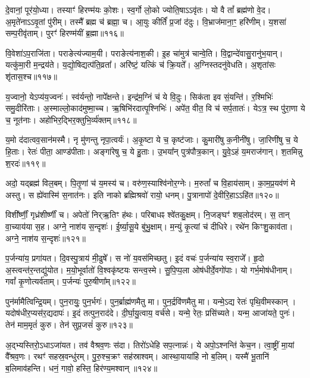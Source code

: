 दे॒वानां॒ पूर॑यो॒ध्या। तस्याꣳ॑ हिरण्म॑यः को॒शः। 
स्व॒र्गो लो॒को ज्योति॒षा\-ऽऽ\-वृ॑तः। यो वै तां᳚ ब्रह्म॑णो वे॒द। 
अ॒मृते॑नाऽऽवृ॒तां पु॑रीम्। तस्मै᳚ ब्रह्म च॑ ब्रह्मा॒ च। 
आ॒युः कीर्तिं॑ प्र॒जां द॑दुः। वि॒भ्राज॑माना॒ꣳ॒ हरि॑णीम्। 
य॒शसा॑ सम्प॒रीवृ॑ताम्। पुरꣳ॑ हिरण्म॑यीं ब्र॒ह्मा॥११६॥


वि॒वेशा॑ऽप॒राजि॑ता। पराङेत्य॑ज्याम॒यी। 
पराङेत्य॑नाश॒की। इ॒ह चा॑मुत्र॑ चान्वे॒ति। 
वि॒द्वान्दे॑वासु॒रानु॑भ॒यान्। यत्कु॑मा॒री म॒न्द्रय॑ते। 
य॒द्यो॒षिद्यत्प॑ति॒व्रता᳚। अरि॑ष्टं॒ यत्किं च॑ क्रि॒यते᳚। 
अ॒ग्निस्तदनु॑वेधति। अ॒शृता॑सः शृ॑तास॒श्च॥११७॥


य॒ज्वानो॒ येऽप्य॑य॒ज्वनः॑। स्व॑र्यन्तो॒ नापे᳚क्षन्ते। 
इन्द्र॑म॒ग्निं च॑ ये वि॒दुः। सिक॑ता इव सं॒यन्ति॑। 
र॒श्मिभिः॑ समु॒दीरि॑ताः। अ॒स्मा\-ल्लो॒का\-द॑मुष्मा॒च्च। 
ऋ॒षिभि॑रदात्पृ॒श्निभिः॑। 
अपे॑त॒ वीत॒ वि च॑ सर्प॒तातः॑। येऽत्र॒ स्थ पु॑रा॒णा ये च॒ नूत॑नाः। 
अहो॑भिर॒द्भिर॒क्तु\-भि॒र्व्य॑क्तम्॥११८॥


य॒मो द॑दात्वव॒सान॑मस्मै। नृ मु॑णन्तु नृपा॒त्वर्यः॑। 
अ॒कृ॒ष्टा ये च॒ कृष्ट॑जाः। कु॒मारी॑षु क॒नीनी॑षु। 
जा॒रिणी॑षु च॒ ये हि॒ताः। रेतः॑ पीता॒ आण्ड॑पीताः। 
अङ्गा॑रेषु च॒ ये हु॒ताः। उ॒भया᳚न्‌ पुत्र॑पौत्र॒कान्। 
यु॒वे॒ऽहं य॒मराज॑गान्। श॒तमिन्नु श॒रदः॑॥११९॥


अदो॒ यद्ब्रह्म॑ विल॒बम्। पि॒तृ॒णां च॑ य॒मस्य॑ च। 
वरु॑ण॒स्याश्वि॑नोर॒ग्नेः। म॒रुतां᳚ च वि॒हाय॑साम्। 
का॒म॒प्र॒यव॑णं मे अस्तु। स ह्ये॑वास्मि॑ स॒नात॑नः। 
इति नाको ब्रह्मिश्रवो॑ रायो॒ धनम्। पु॒त्रानापो॑ दे॒वीरि॒हाऽऽहि॑त॥१२०॥\anuvakamend


विशी᳚र्ष्णीं॒ गृध्र॑शीर्ष्णीं च। अपेतो॑ निर्‌ऋ॒तिꣳ ह॑थः। 
परिबाधꣴ श्वे॑तकु॒क्षम्। नि॒जङ्घꣳ॑ शब॒लोद॑रम्। 
स॒ तान्‌ वा॒च्याय॑या स॒ह। अग्ने॒ नाश॑य स॒न्दृशः॑। 
ई॒र्ष्या॒सू॒ये बु॑भु॒क्षाम्। म॒न्युं कृ॒त्यां च॑ दीधिरे। 
रथे॑न किꣳशु॒काव॑ता। अग्ने॒ नाश॑य स॒न्दृशः॑॥१२१॥\anuvakamend


प॒र्जन्या॑य॒ प्रगा॑यत। दि॒वस्पु॒त्राय॑ मी॒ढुषे᳚। 
स नो॑ य॒वस॑मिच्छतु। इ॒दं वचः॑ प॒र्जन्या॑य स्व॒राजे᳚। 
हृ॒दो अ॒स्त्वन्त॑र॒न्तद्यु॑योत। म॒यो॒भूर्वातो॑ वि॒श्वकृ॑ष्टयः सन्त्व॒स्मे। 
सु॒पि॒प्प॒ला ओष॑धीर्दे॒वगो॑पाः। यो गर्भ॒मोष॑धीनाम्। 
गवां᳚ कृ॒णोत्यर्व॑ताम्। प॒र्जन्यः॑ पुरु॒षीणा᳚म्॥१२२॥\anuvakamend


पुन॑र्मामैत्विन्द्रि॒यम्। पुन॒रायुः॒ पुन॒र्भगः॑। 
पुन॒र्ब्राह्म॑णमैतु मा। पुन॒र्द्रवि॑णमैतु मा। 
यन्मे॒ऽद्य रेतः॑ पृथि॒वीमस्कान्। यदोष॑धीर॒प्यस॑र॒द्यदापः॑। 
इ॒दं तत्पुन॒राद॑दे। दी॒र्घा॒यु॒त्वाय॒ वर्च॑से। 
यन्मे॒ रेतः॒ प्रसि॑च्यते। यन्म॒ आजा॑यते॒ पुनः॑। 
तेन॑ माम॒मृतं॑ कुरु। तेन॑ सुप्र॒जसं॑ कुरु॥१२३॥\anuvakamend


अ॒द्भ्यस्तिरो॒ऽधाऽजा॑यत। तव॑ वैश्रव॒णः स॑दा। 
तिरो॑ऽधेहि सप॒त्नान्नः॑। ये अपो॒ऽश्नन्ति॑ केच॒न। 
त्वा॒ष्ट्रीं मा॒यां वै᳚श्रव॒णः। रथꣳ॑ सहस्र॒वन्धु॑रम्। 
पु॒रु॒श्च॒क्रꣳ सह॑स्राश्वम्। आस्था॒याया॑हि नो ब॒लिम्। 
यस्मै॑ भू॒तानि॑ ब॒लिमाव॑हन्ति। धनं॒ गावो॒ हस्ति॒ हिर॑ण्य॒मश्वान्॥१२४॥


